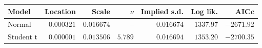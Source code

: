 \begin{tabular}{lrrrrrr}
\toprule
Model & Location & Scale & $\nu$ & Implied s.d. & Log lik. & AICc \\
\midrule
Normal & $0.000321$ & $0.016674$ & -- & $0.016674$ & $1337.97$ & $-2671.92$ \\
Student t & $0.000001$ & $0.013506$ & $5.789$ & $0.016694$ & $1353.20$ & $-2700.35$ \\
\bottomrule
\end{tabular}
